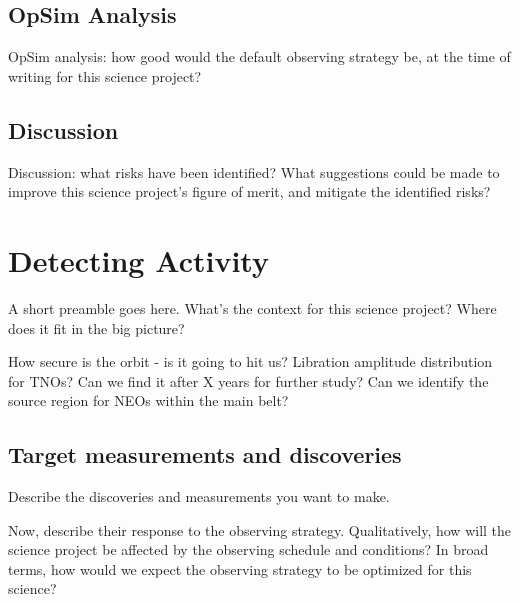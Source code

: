 \subsection{OpSim Analysis}
\label{sec:\secname:analysis}

OpSim analysis: how good would the default observing strategy be, at
the time of writing for this science project?



\subsection{Discussion}
\label{sec:\secname:discussion}

Discussion: what risks have been identified? What suggestions could be
made to improve this science project's figure of merit, and mitigate
the identified risks?

\navigationbar


\section{Detecting Activity}
\def\secname{\chpname:activity}\label{sec:\secname}


A short preamble goes here. What's the context for this science
project? Where does it fit in the big picture?

How secure is the orbit - is it going to hit us?
Libration amplitude distribution for TNOs?
Can we find it after X years for further study?
Can we identify the source region for NEOs within the main belt?


\subsection{Target measurements and discoveries}
\label{sec:\secname:targets}

Describe the discoveries and measurements you want to make.

Now, describe their response to the observing strategy. Qualitatively,
how will the science project be affected by the observing schedule and
conditions? In broad terms, how would we expect the observing strategy
to be optimized for this science?



